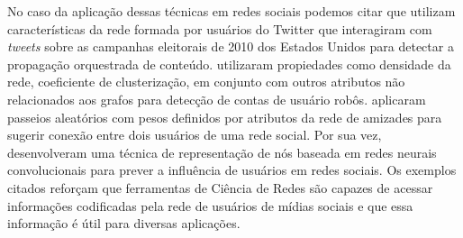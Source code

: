 No caso da aplicação dessas técnicas em redes sociais podemos citar
\citet{ratkiewicz11} que utilizam características da rede formada por usuários do
Twitter que interagiram com \textit{tweets} sobre as campanhas eleitorais de
2010 dos Estados Unidos para detectar a propagação orquestrada de conteúdo.
\citet{varol18} utilizaram propiedades como densidade da rede, coeficiente de
clusterização, em conjunto com outros atributos não relacionados aos grafos para
detecção de contas de usuário robôs.
\citet{backstrom11} aplicaram passeios aleatórios com pesos definidos por
atributos da rede de amizades para sugerir conexão entre dois usuários de uma
rede social.
Por sua vez, \citet{qiu18} desenvolveram uma técnica de representação de nós
baseada em redes neurais convolucionais para prever a influência de usuários em
redes sociais.
Os exemplos citados reforçam que ferramentas de Ciência de Redes são capazes de
acessar informações codificadas pela rede de usuários de mídias sociais e que essa
informação é útil para diversas aplicações.



